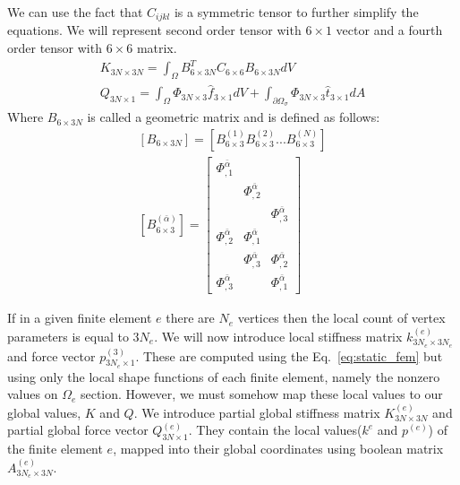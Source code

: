 \documentclass[en]{minipw} %
\begin{document}
We can use the fact that $C_{ijkl}$ is a symmetric tensor to further simplify the equations. We will represent second order tensor with $6 \times 1$ vector and a fourth order tensor with $6 \times 6$ matrix.
\begin{equation}
\label{eq:static_fem}
\begin{aligned}
K_{3N \times 3N} = \int_{\Omega} B^{T}_{6 \times 3N} C_{6 \times 6} B_{6 \times 3N} dV 
\\
Q_{3N \times 1} = \int_{\Omega} \Phi_{3N \times 3} \hat{f}_{3 \times 1} dV + \int_{\partial \Omega_{\sigma}} \Phi_{3N \times 3} \hat{t}_{3 \times 1} dA
\end{aligned}
\end{equation}
Where $B_{6 \times 3N}$ is called a geometric matrix and is defined as follows:
\begin{equation}
\label{eq:geometric_matrix}
\begin{aligned}
[B_{6 \times 3N}] = [B^{(1)}_{6 \times 3} B^{(2)}_{6 \times 3} ... B^{(N)}_{6 \times 3}]
\\
[B^{(\bar{\alpha})}_{6 \times 3}] = 
\begin{bmatrix}
\Phi^{\bar{\alpha}}_{,1} & & \\
 & \Phi^{\bar{\alpha}}_{,2} & \\
& & \Phi^{\bar{\alpha}}_{,3} \\
\Phi^{\bar{\alpha}}_{,2} & \Phi^{\bar{\alpha}}_{,1} & \\
& \Phi^{\bar{\alpha}}_{,3} & \Phi^{\bar{\alpha}}_{,2} \\
\Phi^{\bar{\alpha}}_{,3} & & \Phi^{\bar{\alpha}}_{,1}
\end{bmatrix}
\end{aligned}
\end{equation}

If in a given finite element $e$ there are $N_e$ vertices then the local count of vertex parameters is equal to $3N_e$. We will now introduce local stiffness matrix $k^{(e)}_{3N_e \times 3N_e}$ and force vector $p^{(3)}_{3N_e \times 1}$. These are computed using the Eq.~\ref{eq:static_fem} but using only the local shape functions of each finite element, namely the nonzero values on $\Omega_{e}$ section.
However, we must somehow map these local values to our global values, $K$ and $Q$. We introduce partial global stiffness matrix $K^{(e)}_{3N \times 3N}$ and partial global force vector $Q^{(e)}_{3N \times 1}$. They contain the local values($k^{e}$ and $p^{(e)}$) of the finite element $e$, mapped into their global coordinates using boolean matrix $A^{(e)}_{3N_{e} \times 3N}$.
\end{document}
